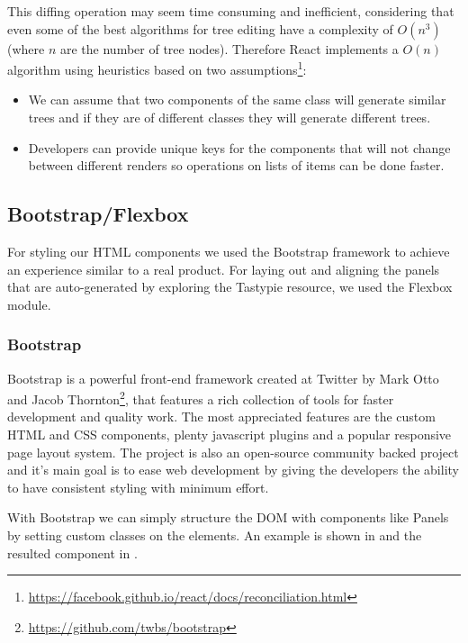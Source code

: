 
This diffing operation may seem time consuming and inefficient, considering that even some of the best algorithms for tree editing have a complexity of $O(n^3)$\cite{trees} (where $n$ are the number of tree nodes). Therefore React implements a $O(n)$ algorithm using heuristics based on two assumptions\footnote{\url{https://facebook.github.io/react/docs/reconciliation.html}}:

\begin{itemize}
	\item We can assume that two components of the same class will generate similar trees and if they are of different classes they will generate different trees.
	\item Developers can provide unique keys for the components that will not change between different renders so operations on lists of items can be done faster.
\end{itemize}




\subsection{Bootstrap/Flexbox}
\label{sub-sec:bootstrap}

For styling our HTML components we used the Bootstrap framework to achieve an experience similar to a real product. For laying out and aligning the panels that are auto-generated by exploring the Tastypie resource, we used the Flexbox module. 

\subsubsection{Bootstrap}
\label{sub-sub-sec:bootstrap}

Bootstrap is a powerful front-end framework created at Twitter by Mark Otto and Jacob Thornton\footnote{\url{https://github.com/twbs/bootstrap}}, that features a rich collection of tools for faster development and quality work. The most appreciated features are the custom HTML and CSS components, plenty javascript plugins and a popular responsive page layout system. The project is also an open-source community backed project and it's main goal is to ease web development by giving the developers the ability to have consistent styling with minimum effort.

With Bootstrap we can simply structure the DOM with components like Panels by setting custom classes on the elements. An example is shown in  and the resulted component in .


